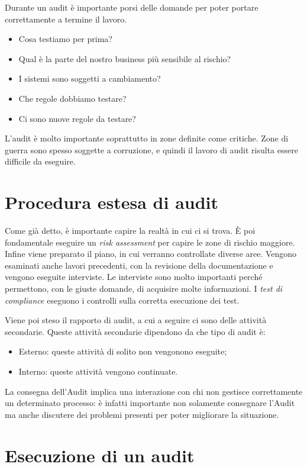 Durante un audit è importante porsi delle domande per poter portare 
correttamente a termine il lavoro.

\begin{itemize}
\item Cosa testiamo per prima?
\item Qual è la parte del nostro business più sensibile al rischio?
\item I sistemi sono soggetti a cambiamento?
\item Che regole dobbiamo testare?
\item Ci sono nuove regole da testare?
\end{itemize}

L'audit è molto importante soprattutto in zone definite come critiche. Zone di
guerra sono spesso soggette a corruzione, e quindi il lavoro di audit risulta
essere difficile da eseguire.

\section{Procedura estesa di audit}

Come già detto, è importante capire la realtà in cui ci si trova. È poi
fondamentale eseguire un \textit{risk assessment} per capire le zone di rischio
maggiore.
Infine viene preparato il piano, in cui verranno controllate diverse aree.
Vengono esaminati anche lavori precedenti, con la revisione della
documentazione
e vengono eseguite interviste. Le interviste sono molto importanti perché
permettono, con le giuste domande, di acquisire molte informazioni.
I \textit{test di compliance} eseguono i controlli sulla corretta esecuzione
dei
test.

Viene poi steso il rapporto di audit, a cui a seguire ci sono delle attività
secondarie. Queste attività secondarie dipendono da che tipo di audit è:
\begin{itemize}
\item Esterno: queste attività di solito non vengonono eseguite;
\item Interno: queste attività vengono continuate.
\end{itemize}

La consegna dell'Audit implica una interazione con chi non gestisce
correttamente un determinato processo: è infatti importante non solamente
consegnare l'Audit ma anche discutere dei problemi presenti per poter
migliorare
la situazione.

\section{Esecuzione di un audit}

